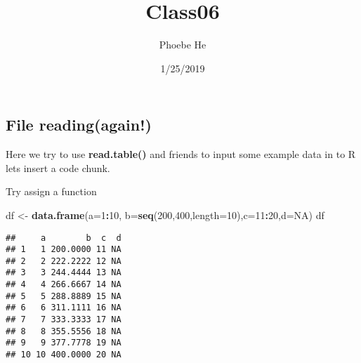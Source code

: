 \documentclass[]{article}
\title{Class06}
\author{Phoebe He}
\date{1/25/2019}
\newenvironment{Shaded}{\begin{snugshade}}{\end{snugshade}}
\newcommand{\KeywordTok}[1]{\textcolor[rgb]{0.13,0.29,0.53}{\textbf{#1}}}
\newcommand{\DataTypeTok}[1]{\textcolor[rgb]{0.13,0.29,0.53}{#1}}
\newcommand{\DecValTok}[1]{\textcolor[rgb]{0.00,0.00,0.81}{#1}}
\newcommand{\StringTok}[1]{\textcolor[rgb]{0.31,0.60,0.02}{#1}}
\newcommand{\OtherTok}[1]{\textcolor[rgb]{0.56,0.35,0.01}{#1}}
\newcommand{\OperatorTok}[1]{\textcolor[rgb]{0.81,0.36,0.00}{\textbf{#1}}}
\newcommand{\NormalTok}[1]{#1}
\begin{document}
\maketitle

\subsection{File reading(again!)}\label{file-readingagain}

Here we try to use \textbf{read.table()} and friends to input some
example data in to R lets insert a code chunk.

\begin{Shaded}
\end{Shaded}

Try assign a function

\begin{Shaded}
\begin{Highlighting}[]
\NormalTok{df <-}\StringTok{ }\KeywordTok{data.frame}\NormalTok{(}\DataTypeTok{a=}\DecValTok{1}\OperatorTok{:}\DecValTok{10}\NormalTok{, }\DataTypeTok{b=}\KeywordTok{seq}\NormalTok{(}\DecValTok{200}\NormalTok{,}\DecValTok{400}\NormalTok{,}\DataTypeTok{length=}\DecValTok{10}\NormalTok{),}\DataTypeTok{c=}\DecValTok{11}\OperatorTok{:}\DecValTok{20}\NormalTok{,}\DataTypeTok{d=}\OtherTok{NA}\NormalTok{) }
\NormalTok{df}
\end{Highlighting}
\end{Shaded}

\begin{verbatim}
##     a        b  c  d
## 1   1 200.0000 11 NA
## 2   2 222.2222 12 NA
## 3   3 244.4444 13 NA
## 4   4 266.6667 14 NA
## 5   5 288.8889 15 NA
## 6   6 311.1111 16 NA
## 7   7 333.3333 17 NA
## 8   8 355.5556 18 NA
## 9   9 377.7778 19 NA
## 10 10 400.0000 20 NA
\end{verbatim}
\end{document}
